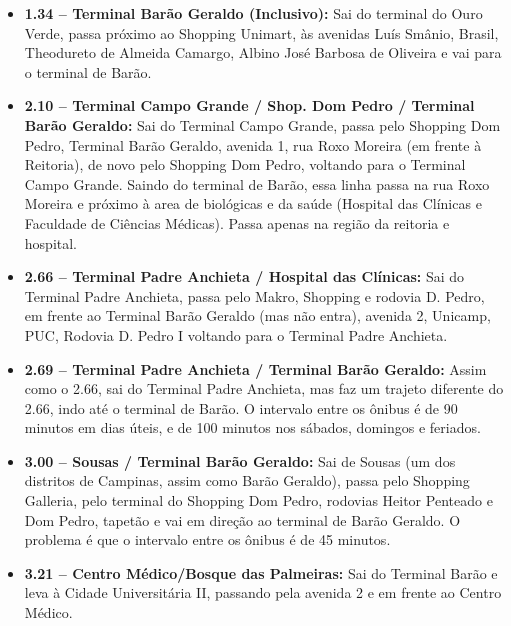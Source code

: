 \begin{itemize}
    \item  \textbf{1.34 -- Terminal Barão Geraldo (Inclusivo):} Sai do terminal
        do Ouro Verde, passa próximo ao Shopping Unimart, às avenidas Luís
        Smânio, Brasil, Theodureto de Almeida Camargo, Albino José Barbosa de
        Oliveira e vai para o terminal de Barão.

    \item  \textbf{2.10 -- Terminal Campo Grande / Shop. Dom Pedro / Terminal
        Barão Geraldo:} Sai do Terminal Campo Grande, passa pelo Shopping Dom
        Pedro, Terminal Barão Geraldo, avenida 1, rua Roxo Moreira (em frente à
        Reitoria), de novo pelo Shopping Dom Pedro, voltando para o Terminal
        Campo Grande.  Saindo do terminal de Barão, essa linha passa na rua Roxo
        Moreira e próximo à area de biológicas e da saúde (Hospital das Clínicas
        e Faculdade de Ciências Médicas). Passa apenas na região da reitoria e
        hospital.

    \item  \textbf{2.66 -- Terminal Padre Anchieta / Hospital das Clínicas:} Sai
        do Terminal Padre Anchieta, passa pelo Makro, Shopping e rodovia D.
        Pedro, em frente ao Terminal Barão Geraldo (mas não entra), avenida 2,
        Unicamp, PUC, Rodovia D. Pedro I voltando para o Terminal Padre
        Anchieta.

    \item  \textbf{2.69 -- Terminal Padre Anchieta / Terminal Barão Geraldo:}
        Assim como o 2.66, sai do Terminal Padre Anchieta, mas faz um trajeto
        diferente do 2.66, indo até o terminal de Barão. O intervalo entre os
        ônibus é de 90 minutos em dias úteis, e de 100 minutos nos sábados,
        domingos e feriados.

    \item  \textbf{3.00 -- Sousas / Terminal Barão Geraldo:} Sai de Sousas (um
        dos distritos de Campinas, assim como Barão Geraldo), passa pelo
        Shopping Galleria, pelo terminal do Shopping Dom Pedro, rodovias Heitor
        Penteado e Dom Pedro, tapetão e vai em direção ao terminal de Barão
        Geraldo.  O problema é que o intervalo entre os ônibus é de 45 minutos.

    \item  \textbf{3.21 -- Centro Médico/Bosque das Palmeiras:} Sai do Terminal
        Barão e leva à Cidade Universitária II, passando pela avenida 2 e em
        frente ao Centro Médico.


\end{itemize}
